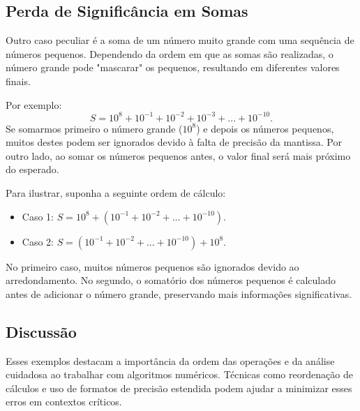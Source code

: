 \subsection{Perda de Significância em Somas}
Outro caso peculiar é a soma de um número muito grande com uma sequência de números pequenos. Dependendo da ordem em que as somas são realizadas, o número grande pode "mascarar" os pequenos, resultando em diferentes valores finais.

Por exemplo:
\[
S = 10^{8} + 10^{-1} + 10^{-2} + 10^{-3} + \ldots + 10^{-10}.
\]
Se somarmos primeiro o número grande (\(10^8\)) e depois os números pequenos, muitos destes podem ser ignorados devido à falta de precisão da mantissa. Por outro lado, ao somar os números pequenos antes, o valor final será mais próximo do esperado.

Para ilustrar, suponha a seguinte ordem de cálculo:
\begin{itemize}
    \item Caso 1: \(S = 10^{8} + (10^{-1} + 10^{-2} + \ldots + 10^{-10})\).
    \item Caso 2: \(S = (10^{-1} + 10^{-2} + \ldots + 10^{-10}) + 10^{8}\).
\end{itemize}
No primeiro caso, muitos números pequenos são ignorados devido ao arredondamento. No segundo, o somatório dos números pequenos é calculado antes de adicionar o número grande, preservando mais informações significativas.

\subsection{Discussão}
Esses exemplos destacam a importância da ordem das operações e da análise cuidadosa ao trabalhar com algoritmos numéricos. Técnicas como reordenação de cálculos e uso de formatos de precisão estendida podem ajudar a minimizar esses erros em contextos críticos.
